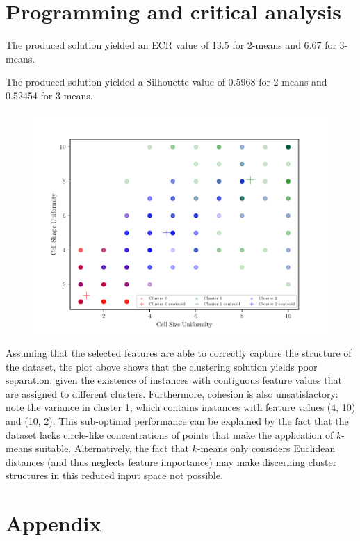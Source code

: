 \documentclass{exam}
\begin{document}
    \section{Programming and critical analysis}
    \begin{questions}
        \setcounter{question}{3}
        \item \quad
        \begin{parts}
            \vspace{-1.6em}
            \item The produced solution yielded an ECR value of 13.5 for 2-means and 6.67 for 3-means.
            \item The produced solution yielded a Silhouette value of 0.5968 for 2-means and 0.52454 for 3-means. 
        \end{parts}
        \item \quad
        \vspace{-1.2em}
        \begin{figure}[H]
            \centering
            \includegraphics{3means.pdf}
        \end{figure}
        \item Assuming that the selected features are able to correctly capture the structure of the dataset, the plot above shows that the clustering solution yields poor separation, given the existence of instances with contiguous feature values that are assigned to different clusters. Furthermore, cohesion is also unsatisfactory: note the variance in cluster 1, which contains instances with feature values (4, 10) and (10, 2). This sub-optimal performance can be explained by the fact that the dataset lacks circle-like concentrations of points that make the application of $k$-means suitable. Alternatively, the fact that $k$-means only considers Euclidean distances (and thus neglects feature importance) may make discerning cluster structures in this reduced input space not possible.
    \end{questions}

    \pagebreak
    \section{Appendix}
    \inputminted{python}{src/part02.py}
   
    
    
\end{document}
